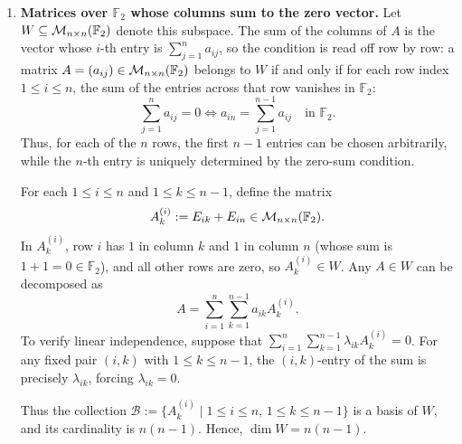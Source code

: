 \begin{exercisesolution*}
\begin{enumerate}[label=\textbf{(\alph*)}]
    Any symmetric matrix $A \in W$ satisfies
    \[
        A = \sum_{i=1}^n a_{ii} D_i + \sum_{1 \le i < j \le n} a_{ij} S_{ij}.
    \]
    To verify linear independence, suppose that
    \[
        \sum_{i=1}^n \alpha_{ii} D_i + \sum_{1 \le i < j \le n} \alpha_{ij} S_{ij} = 0.
    \]
    Examining the diagonal entries yields $\alpha_{ii} = 0$ for each $1 \le i \le n$. For $i < j$, the $(i, j)$-entry of the linear combination is $\alpha_{ij}$, which implies $\alpha_{ij} = 0$. Thus, the family
    \[
        \mathcal{B} := \{D_i \mid 1 \le i \le n\} \cup \{S_{ij} \mid 1 \le i < j \le n\}
    \]
    is linearly independent and spans $W$, so it is a basis. Its cardinality is
    \[
        n + \binom{n}{2} = n + \frac{n(n-1)}{2} = \frac{n(n+1)}{2}.
    \]
    Therefore, $\dim W = \frac{n(n+1)}{2}$.

    \item \textbf{Matrices over $\mathbb{F}_2$ whose columns sum to the zero vector.} Let $W \subseteq \mathcal{M}_{n \times n}(\mathbb{F}_2)$ denote this subspace. The sum of the columns of $A$ is the vector whose $i$-th entry is $\sum_{j=1}^n a_{ij}$, so the condition is read off row by row: a matrix $A = (a_{ij}) \in \mathcal{M}_{n \times n}(\mathbb{F}_2)$ belongs to $W$ if and only if for each row index $1 \le i \le n$, the sum of the entries across that row vanishes in $\mathbb{F}_2$:
    \[
        \sum_{j=1}^n a_{ij} = 0 \iff a_{in} = \sum_{j=1}^{n-1} a_{ij} \quad \text{in } \mathbb{F}_2.
    \]
    Thus, for each of the $n$ rows, the first $n-1$ entries can be chosen arbitrarily, while the $n$-th entry is uniquely determined by the zero-sum condition.
    
    For each $1 \le i \le n$ and $1 \le k \le n-1$, define the matrix
    \[
        A_k^{(i)} := E_{ik} + E_{in} \in \mathcal{M}_{n \times n}(\mathbb{F}_2).
    \]
    In $A_k^{(i)}$, row $i$ has $1$ in column $k$ and $1$ in column $n$ (whose sum is $1 + 1 = 0 \in \mathbb{F}_2$), and all other rows are zero, so $A_k^{(i)} \in W$. Any $A \in W$ can be decomposed as
    \[
        A = \sum_{i=1}^n \sum_{k=1}^{n-1} a_{ik} A_k^{(i)}.
    \]
    To verify linear independence, suppose that $\sum_{i=1}^n \sum_{k=1}^{n-1} \lambda_{ik} A_k^{(i)} = 0$. For any fixed pair $(i, k)$ with $1 \le k \le n-1$, the $(i, k)$-entry of the sum is precisely $\lambda_{ik}$, forcing $\lambda_{ik} = 0$.
    
    Thus the collection $\mathcal{B} := \{A_k^{(i)} \mid 1 \le i \le n,\, 1 \le k \le n-1\}$ is a basis of $W$, and its cardinality is $n(n-1)$. Hence, $\dim W = n(n-1)$.
\end{enumerate}
\end{exercisesolution*}

